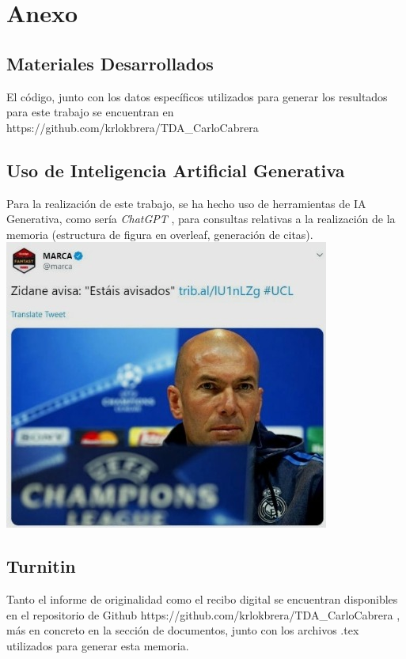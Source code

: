 \chapter{Anexo} \label{chp:anexo}

\section{Materiales Desarrollados}
El código, junto con los datos específicos utilizados para generar los resultados para este trabajo se encuentran en https://github.com/krlokbrera/TDA\_CarloCabrera

\section{Uso de Inteligencia Artificial Generativa}

Para la realización de este trabajo, se ha hecho uso de herramientas de IA Generativa, como sería \textit{ChatGPT} \cite{chatgpt_conversacion}, para consultas relativas a la realización de la memoria (estructura de figura en overleaf, generación de citas).
\includegraphics[scale=0.001]{images/anexo.jpg}

\section{Turnitin}

Tanto el informe de originalidad como el recibo digital se encuentran disponibles en el repositorio de Github https://github.com/krlokbrera/TDA\_CarloCabrera , más en concreto en la sección de documentos, junto con los archivos .tex utilizados para generar esta memoria.